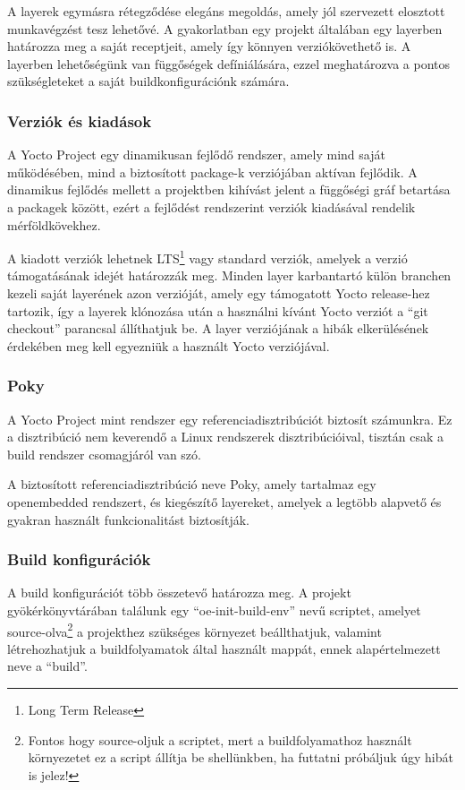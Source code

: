 A layerek egymásra rétegződése elegáns megoldás, amely jól szervezett elosztott
munkavégzést tesz lehetővé. A gyakorlatban egy projekt általában egy layerben
határozza meg a saját receptjeit, amely így könnyen verziókövethető is. A
layerben lehetőségünk van függőségek defíniálására, ezzel meghatározva a pontos
szükségleteket a saját buildkonfigurációnk számára. 

\subsubsection{Verziók és kiadások}

A Yocto Project egy dinamikusan fejlődő rendszer, amely mind saját működésében,
mind a biztosított package-k verziójában aktívan fejlődik. A dinamikus fejlődés
mellett a projektben kihívást jelent a függőségi gráf betartása a packagek
között, ezért a fejlődést rendszerint verziók kiadásával rendelik
mérföldkövekhez.

A kiadott verziók lehetnek LTS\footnote{Long Term Release} vagy standard verziók,
amelyek a verzió támogatásának idejét határozzák meg. Minden layer karbantartó
külön branchen kezeli saját layerének azon verzióját, amely egy támogatott Yocto
release-hez tartozik, így a layerek klónozása után a használni kívánt Yocto
verziót a ``git checkout'' parancsal állíthatjuk be. A layer verziójának a hibák
elkerülésének érdekében meg kell egyezniük a használt Yocto verziójával.

\subsubsection{Poky}

A Yocto Project mint rendszer egy referenciadisztribúciót biztosít számunkra. Ez
a disztribúció nem keverendő a Linux rendszerek disztribúcióival, tisztán csak a
build rendszer csomagjáról van szó.

A biztosított referenciadisztribúció neve Poky, amely tartalmaz egy openembedded
rendszert, és kiegészítő layereket, amelyek a legtöbb alapvető és gyakran
használt funkcionalitást biztosítják.

\subsubsection{Build konfigurációk}

A build konfigurációt több összetevő határozza meg. A projekt gyökérkönyvtárában
találunk egy ``oe-init-build-env'' nevű scriptet, amelyet
source-olva\footnote{Fontos hogy source-oljuk a scriptet, mert a buildfolyamathoz
használt környezetet ez a script állítja be shellünkben, ha futtatni próbáljuk
úgy hibát is jelez!} a projekthez szükséges környezet beállthatjuk, valamint
létrehozhatjuk a buildfolyamatok által használt mappát, ennek alapértelmezett
neve a ``build''.

